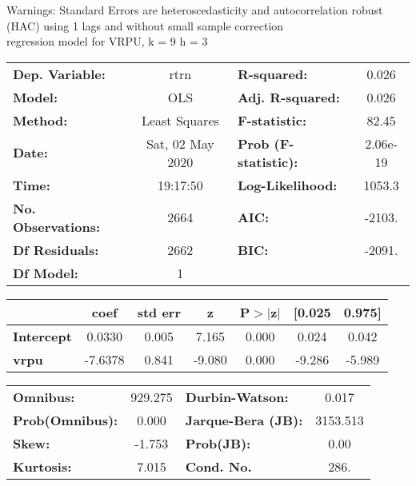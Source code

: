 Warnings: \newline
 [1] Standard Errors are heteroscedasticity and autocorrelation robust (HAC) using 1 lags and without small sample correction\\ 

regression model for VRPU, k = 9 h = 3\begin{center}
\begin{tabular}{lclc}
\toprule
\textbf{Dep. Variable:}    &       rtrn       & \textbf{  R-squared:         } &     0.026   \\
\textbf{Model:}            &       OLS        & \textbf{  Adj. R-squared:    } &     0.026   \\
\textbf{Method:}           &  Least Squares   & \textbf{  F-statistic:       } &     82.45   \\
\textbf{Date:}             & Sat, 02 May 2020 & \textbf{  Prob (F-statistic):} &  2.06e-19   \\
\textbf{Time:}             &     19:17:50     & \textbf{  Log-Likelihood:    } &    1053.3   \\
\textbf{No. Observations:} &        2664      & \textbf{  AIC:               } &    -2103.   \\
\textbf{Df Residuals:}     &        2662      & \textbf{  BIC:               } &    -2091.   \\
\textbf{Df Model:}         &           1      & \textbf{                     } &             \\
\bottomrule
\end{tabular}
\begin{tabular}{lcccccc}
                   & \textbf{coef} & \textbf{std err} & \textbf{z} & \textbf{P$> |$z$|$} & \textbf{[0.025} & \textbf{0.975]}  \\
\midrule
\textbf{Intercept} &       0.0330  &        0.005     &     7.165  &         0.000        &        0.024    &        0.042     \\
\textbf{vrpu}      &      -7.6378  &        0.841     &    -9.080  &         0.000        &       -9.286    &       -5.989     \\
\bottomrule
\end{tabular}
\begin{tabular}{lclc}
\textbf{Omnibus:}       & 929.275 & \textbf{  Durbin-Watson:     } &    0.017  \\
\textbf{Prob(Omnibus):} &   0.000 & \textbf{  Jarque-Bera (JB):  } & 3153.513  \\
\textbf{Skew:}          &  -1.753 & \textbf{  Prob(JB):          } &     0.00  \\
\textbf{Kurtosis:}      &   7.015 & \textbf{  Cond. No.          } &     286.  \\
\bottomrule
\end{tabular}
\end{center}

